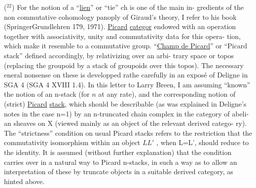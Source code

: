 
(${}^{22}$) For the notion of a ``\uline{lien}'' \hand{(}or ``tie''\hand{)}\hand{,} ch is one of the main in-%
gredients of the non commutative cohomology panoply of Giraud's theory, I
refer to his book (Springer\hand{,}Grundlehren 179, 1971).\hand{/} \uline{Picard} \uline{categor}
\margin{\hand{$\otimes$,}}  endowed with an operation \inserted{$\otimes$}  
together with associativity, unity and commutativity data for this opera-%
tion, which make it resemble to a commutative group.  ``\uline{Champ de Picard}''
\hand{(}or ``Picard stack''\hand{)}   defined accordingly, by relativizing over an arbi-%
trary space or topos (replacing the groupoid by a stack of groupoids over
this topos). The necessary eneral nonsense on these  is developped rathe
carefully in an exposé of Deligne in SGA 4 (SGA 4 XVIII 1.4). In this
letter to Larry Breen, I am assuming ``known'' the notion of an n-stack
(for $n$ at any rate), and the corresponding notion of (strict) \uline{Picard}
\uline{stack}, which should be describable (as was explained in Deligne's notes
in the case n=1) by an n-truncated chain complex in the category of abeli-%
an sheaves on X (viewed mainly as an object of the relevant derived catego-%
ry). The ``strictness'' condition on usual Picard stacks refers to the
restriction that the commutativity isomorphism within an object $L$\hand{$\otimes$}$L'$ , 
when L=L', should reduce to the identity. It is assumed (without further
explanation) that the condition carries over in a natural way to Picard
n-stacks, in such a way as to allow an interpretation of these by truncate
objects in a suitable derived category, as hinted above.

